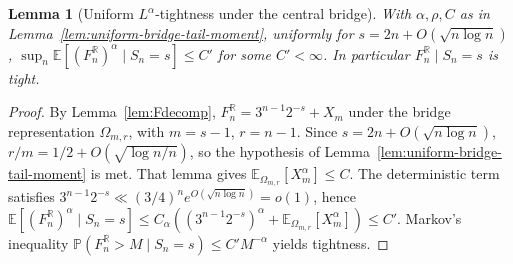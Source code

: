 \documentclass[11pt,a4paper]{amsart}
\theoremstyle{plain}
\newtheorem{lemma}[theorem]{Lemma}
\theoremstyle{definition}
\newcommand{\R}{\mathbb{R}}
\newcommand{\E}{\mathbb{E}}
\newcommand{\PP}{\mathbb{P}}
\begin{document}
\begin{lemma}[Uniform $L^\alpha$-tightness under the central bridge]
\label{lem:uniform-bridge-tightness}
With $\alpha,\rho,C$ as in Lemma~\ref{lem:uniform-bridge-tail-moment},
uniformly for $s=2n+O(\sqrt{n\log n})$,
$\sup_n\E[(F_n^{\R})^\alpha\mid S_n=s]\le C'$ for some $C'<\infty$.
In particular $F_n^{\R}\mid S_n=s$ is tight.
\end{lemma}

\begin{proof}
By Lemma~\ref{lem:Fdecomp}, $F_n^{\R}=3^{n-1}2^{-s}+X_m$ under the bridge
representation $\Omega_{m,r}$, with $m=s-1$, $r=n-1$.
Since $s=2n+O(\sqrt{n\log n})$, $r/m=1/2+O(\sqrt{\log n/n})$, so the
hypothesis of Lemma~\ref{lem:uniform-bridge-tail-moment} is met.
That lemma gives $\E_{\Omega_{m,r}}[X_m^\alpha]\le C$.
The deterministic term satisfies $3^{n-1}2^{-s}\ll(3/4)^n e^{O(\sqrt{n\log n})}=o(1)$,
hence $\E[(F_n^{\R})^\alpha\mid S_n=s]\le C_\alpha((3^{n-1}2^{-s})^\alpha+\E_{\Omega_{m,r}}[X_m^\alpha])\le C'$.
Markov's inequality $\PP(F_n^{\R}>M\mid S_n=s)\le C'M^{-\alpha}$ yields tightness.
\end{proof}
\end{document}
